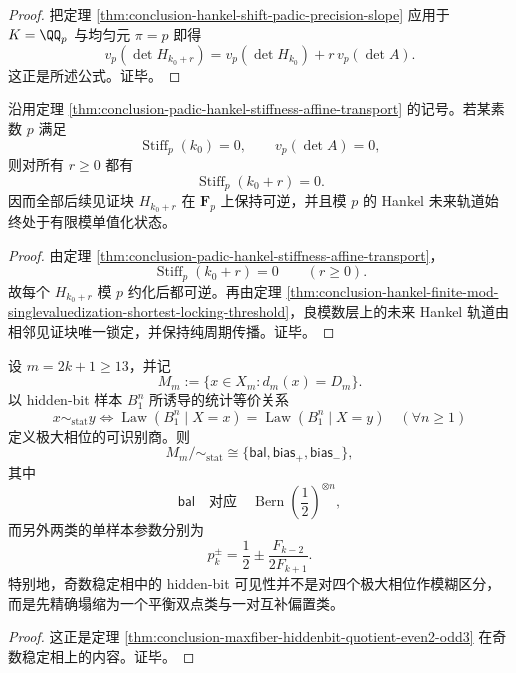 \begin{proof}
把定理 \ref{thm:conclusion-hankel-shift-padic-precision-slope} 应用于 \(K=\QQ_p\) 与均匀元 \(\pi=p\) 即得
\[
v_p(\det H_{k_0+r})
=
v_p(\det H_{k_0})+r\,v_p(\det A).
\]
这正是所述公式。证毕。
\end{proof}

\begin{corollary}[良素数的永久稳定性]\label{cor:conclusion-goodprime-permanent-hankel-stability}
沿用定理 \ref{thm:conclusion-padic-hankel-stiffness-affine-transport} 的记号。若某素数 \(p\) 满足
\[
\operatorname{Stiff}_p(k_0)=0,
\qquad
v_p(\det A)=0,
\]
则对所有 \(r\ge 0\) 都有
\[
\operatorname{Stiff}_p(k_0+r)=0.
\]
因而全部后续见证块 \(H_{k_0+r}\) 在 \(\mathbf F_p\) 上保持可逆，并且模 \(p\) 的 Hankel 未来轨道始终处于有限模单值化状态。
\end{corollary}

\begin{proof}
由定理 \ref{thm:conclusion-padic-hankel-stiffness-affine-transport}，
\[
\operatorname{Stiff}_p(k_0+r)=0
\qquad (r\ge 0).
\]
故每个 \(H_{k_0+r}\) 模 \(p\) 约化后都可逆。再由定理 \ref{thm:conclusion-hankel-finite-mod-singlevaluedization-shortest-locking-threshold}，良模数层上的未来 Hankel 轨道由相邻见证块唯一锁定，并保持纯周期传播。证毕。
\end{proof}

\begin{theorem}\label{thm:conclusion-hiddenbit-triquotient-balanced-biased-splitting}
设 \(m=2k+1\ge 13\)，并记
\[
M_m:=\{x\in X_m:d_m(x)=D_m\}.
\]
以 hidden-bit 样本 \(B_1^n\) 所诱导的统计等价关系
\[
x\sim_{\mathrm{stat}}y
\iff
\operatorname{Law}(B_1^n\mid X=x)=\operatorname{Law}(B_1^n\mid X=y)
\quad(\forall n\ge 1)
\]
定义极大相位的可识别商。则
\[
M_m/\!\sim_{\mathrm{stat}}
\cong
\{\mathsf{bal},\mathsf{bias}_+,\mathsf{bias}_-\},
\]
其中
\[
\mathsf{bal}
\quad\text{对应}\quad
\operatorname{Bern}\!\left(\frac12\right)^{\otimes n},
\]
而另外两类的单样本参数分别为
\[
p_k^{\pm}
=
\frac12\pm\frac{F_{k-2}}{2F_{k+1}}.
\]
特别地，奇数稳定相中的 hidden-bit 可见性并不是对四个极大相位作模糊区分，而是先精确塌缩为一个平衡双点类与一对互补偏置类。
\end{theorem}

\begin{proof}
这正是定理 \ref{thm:conclusion-maxfiber-hiddenbit-quotient-even2-odd3} 在奇数稳定相上的内容。证毕。
\end{proof}

